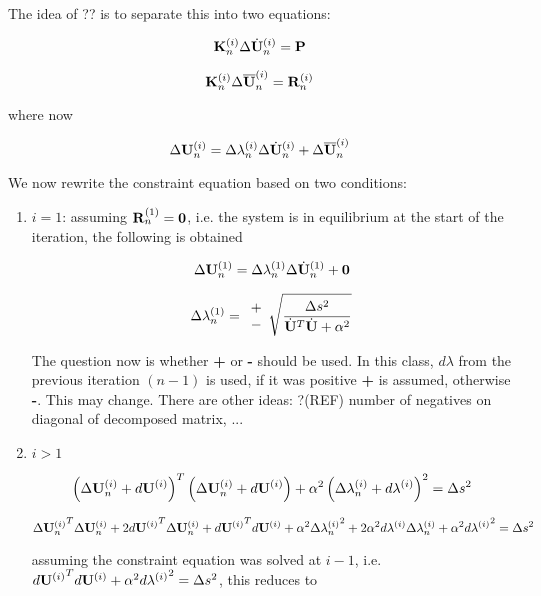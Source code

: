 \noindent The idea of ?? is to separate this into two equations:

\def\Uh{\dot{\bf U}}
\def\Ub{\overline{\bf U}}

\[
\K_n^{(i)} \Delta \Uh_n^{(i)} = \P
\]

\[
\K_n^{(i)} \Delta \Ub_n^{(i)} = \R_n^{(i)}
\]

\noindent where now

\begin{equation}
 \Delta \U_n^{(i)} = \Delta \lambda_n^{(i)} \Delta \Uh_n^{(i)} +
\Delta \Ub_n^{(i)}  
\label{splitForm}
\end{equation}

\noindent We now rewrite the constraint equation based on two conditions:

\begin{enumerate}
\item {\bf $i = 1$}: assuming ${\bf R}_n^{(1)} = {\bf 0}$, i.e. the system is
in equilibrium at the start of the iteration, the following is obtained

\[  \Delta \U_n^{(1)} = \Delta \lambda_n^{(1)} \Delta \Uh_n^{(1)} + \zero \]

\[ \Delta \lambda_n^{(1)} = \begin{array}{c} + \\ - \end{array}
\sqrt{\frac{\Delta s^2}{\Uh^T \Uh + \alpha^2}} \]

\noindent The question now is whether {\bf +} or {\bf -} should be
used. In this class, $d \lambda$ from the previous iteration $(n-1)$
is used, if it was positive {\bf +} is assumed, otherwise {\bf -}. This may
change. There are other ideas: ?(REF) number of negatives on diagonal
of decomposed matrix, ...

\item {\bf $i > 1$}

\[ \left( \Delta {\bf U}_n^{(i)} + d{\bf U}^{(i)} \right)^T \left( \Delta {\bf U}_n^{(i)} +
d{\bf U}^{(i)} \right) + \alpha^2 \left( \Delta \lambda_n^{(i)} + d\lambda^{(i)}
\right)^2 = \Delta s^2 \]

\[
\Delta {{\bf U}_n^{(i)}}^T\Delta {\bf U}_n^{(i)} + 2{d{\bf U}^{(i)}}^T\Delta {\bf U}_n^{(i)} + {d{\bf U}^{(i)}}^T d{\bf U}^{(i)}
+ \alpha^2 \Delta {\lambda_n^{(i)}}^2
+ 2 \alpha^2 d\lambda^{(i)} \Delta \lambda_n^{(i)} + \alpha^2 {d\lambda^{(i)}}^2
= \Delta s^2
\]

\noindent assuming the constraint equation was solved at $i-1$,
i.e. ${d{\bf U}^{(i)}}^T d{\bf U}^{(i)} + \alpha^2 {d\lambda^{(i)}}^2 = \Delta s^2$, this reduces to


\end{enumerate}
